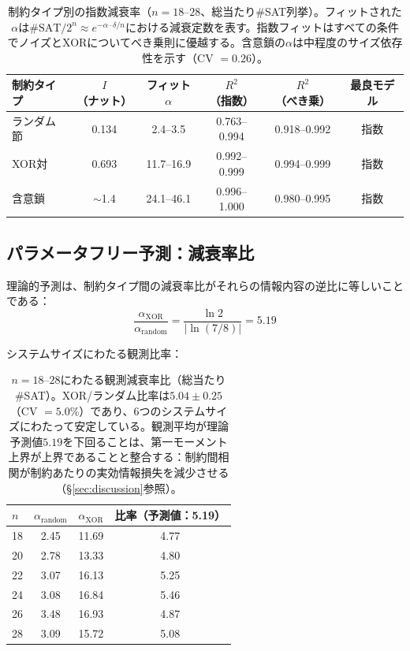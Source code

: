 \documentclass[11pt,a4paper]{article}
\begin{document}
\begin{table}[htbp]
\centering
\begin{tabular}{lccccc}
\toprule
\textbf{制約タイプ} & \textbf{$I$（ナット）} & \textbf{フィット$\alpha$} & \textbf{$R^2$（指数）} & \textbf{$R^2$（べき乗）} & \textbf{最良モデル} \\
\midrule
ランダム節 & 0.134 & 2.4--3.5 & 0.763--0.994 & 0.918--0.992 & 指数 \\
XOR対 & 0.693 & 11.7--16.9 & 0.992--0.999 & 0.994--0.999 & 指数 \\
含意鎖 & $\sim$1.4 & 24.1--46.1 & 0.996--1.000 & 0.980--0.995 & 指数 \\
\bottomrule
\end{tabular}
\caption{制約タイプ別の指数減衰率（$n = 18$--$28$、総当たり\#SAT列挙）。フィットされた$\alpha$は$\#\text{SAT}/2^n \approx e^{-\alpha \cdot \delta/n}$における減衰定数を表す。指数フィットはすべての条件でノイズとXORについてべき乗則に優越する。含意鎖の$\alpha$は中程度のサイズ依存性を示す（CV $= 0.26$）。}
\label{tab:sat-decay}
\end{table}

\subsection{パラメータフリー予測：減衰率比}

理論的予測は、制約タイプ間の減衰率比がそれらの情報内容の逆比に等しいことである：
\[
\frac{\alpha_{\text{XOR}}}{\alpha_{\text{random}}} = \frac{\ln 2}{|\ln(7/8)|} = 5.19
\]

システムサイズにわたる観測比率：

\begin{table}[htbp]
\centering
\begin{tabular}{lccc}
\toprule
$n$ & $\alpha_{\text{random}}$ & $\alpha_{\text{XOR}}$ & 比率（予測値：5.19） \\
\midrule
18 & 2.45 & 11.69 & 4.77 \\
20 & 2.78 & 13.33 & 4.80 \\
22 & 3.07 & 16.13 & 5.25 \\
24 & 3.08 & 16.84 & 5.46 \\
26 & 3.48 & 16.93 & 4.87 \\
28 & 3.09 & 15.72 & 5.08 \\
\bottomrule
\end{tabular}
\caption{$n = 18$--$28$にわたる観測減衰率比（総当たり\#SAT）。XOR/ランダム比率は$5.04 \pm 0.25$（CV $= 5.0\%$）であり、6つのシステムサイズにわたって安定している。観測平均が理論予測値$5.19$を下回ることは、第一モーメント上界が上界であることと整合する：制約間相関が制約あたりの実効情報損失を減少させる（\S\ref{sec:discussion}参照）。}
\label{tab:ratio}
\end{table}
\end{document}
